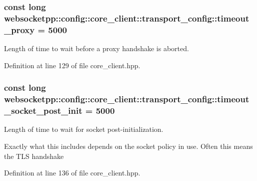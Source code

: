 \subsubsection[{timeout\+\_\+proxy}]{\setlength{\rightskip}{0pt plus 5cm}const long websocketpp\+::config\+::core\+\_\+client\+::transport\+\_\+config\+::timeout\+\_\+proxy = 5000\hspace{0.3cm}{\ttfamily [static]}}\label{structwebsocketpp_1_1config_1_1core__client_1_1transport__config_ab03c89468c0af9b6285ae467b8436a98}


Length of time to wait before a proxy handshake is aborted. 



Definition at line 129 of file core\+\_\+client.\+hpp.

\hypertarget{structwebsocketpp_1_1config_1_1core__client_1_1transport__config_af375d91583cd6e2a93fef38c75822d82}{}
\subsubsection[{timeout\+\_\+socket\+\_\+post\+\_\+init}]{\setlength{\rightskip}{0pt plus 5cm}const long websocketpp\+::config\+::core\+\_\+client\+::transport\+\_\+config\+::timeout\+\_\+socket\+\_\+post\+\_\+init = 5000\hspace{0.3cm}{\ttfamily [static]}}\label{structwebsocketpp_1_1config_1_1core__client_1_1transport__config_af375d91583cd6e2a93fef38c75822d82}


Length of time to wait for socket post-\/initialization. 

Exactly what this includes depends on the socket policy in use. Often this means the T\+L\+S handshake 

Definition at line 136 of file core\+\_\+client.\+hpp.

\hypertarget{structwebsocketpp_1_1config_1_1core__client_1_1transport__config_a529a1a4bf59b86dfebbf0e65b3b1ce25}{}
